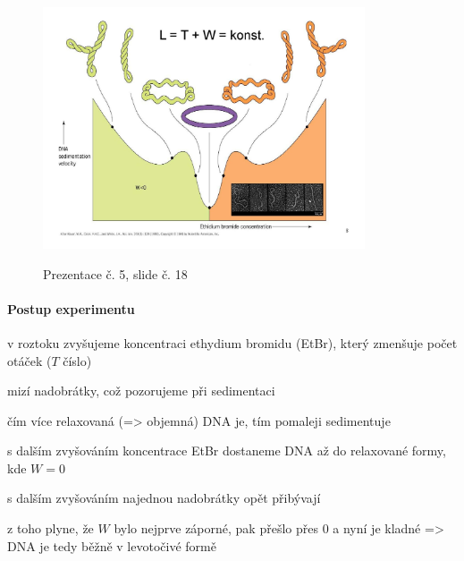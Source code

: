 \documentclass[DIV=8]{scrreprt}
\begin{document}
\begin{figure}
    \caption{Prezentace č. 5, slide č. 18}
    \includegraphics[width=0.85\textwidth]{slides-5/slide-18.jpg}
    \centering
    \label{slides-5-slide-18}
\end{figure}

\paragraph{Postup experimentu}
\begin{myEnumerate}[nosep]
    \item v roztoku zvyšujeme koncentraci ethydium bromidu (EtBr), který zmenšuje počet otáček (\(T\) číslo)
    \item mizí nadobrátky, což pozorujeme při sedimentaci
\begin{myItemize}[nosep]
    \item čím více relaxovaná (=> objemná) DNA je, tím pomaleji sedimentuje
\end{myItemize}

    \item s dalším zvyšováním koncentrace EtBr dostaneme DNA až do relaxované formy, kde \(W = 0\)
    \item s dalším zvyšováním najednou nadobrátky opět přibývají
\begin{myItemize}[nosep]
    \item z toho plyne, že \(W\) bylo nejprve záporné, pak přešlo přes 0 a nyní je kladné => DNA je tedy běžně v levotočivé formě
\end{myItemize}

\end{myEnumerate}
\end{document}
